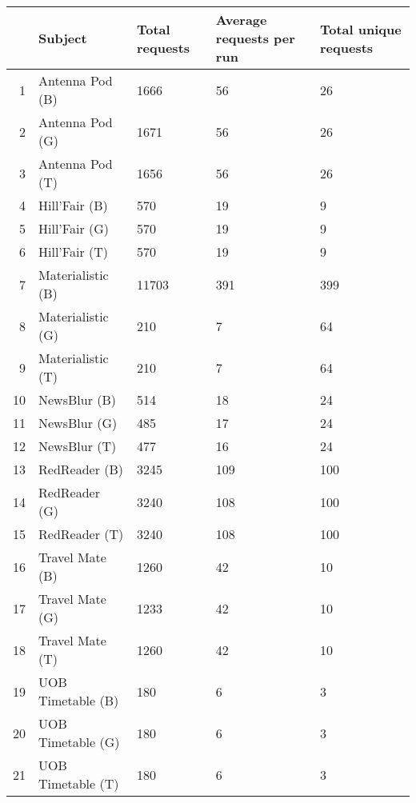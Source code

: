 \begin{table}[ht]
\centering
\begin{tabular}{rllll}
  \hline
 & Subject & Total requests & Average requests per run & Total unique requests \\ 
  \hline
1 & Antenna Pod (B) & 1666 & 56 & 26 \\ 
  2 & Antenna Pod (G) & 1671 & 56 & 26 \\ 
  3 & Antenna Pod (T) & 1656 & 56 & 26 \\ 
  4 & Hill'Fair (B) & 570 & 19 & 9 \\ 
  5 & Hill'Fair (G) & 570 & 19 & 9 \\ 
  6 & Hill'Fair (T) & 570 & 19 & 9 \\ 
  7 & Materialistic (B) & 11703 & 391 & 399 \\ 
  8 & Materialistic (G) & 210 & 7 & 64 \\ 
  9 & Materialistic (T) & 210 & 7 & 64 \\ 
  10 & NewsBlur (B) & 514 & 18 & 24 \\ 
  11 & NewsBlur (G) & 485 & 17 & 24 \\ 
  12 & NewsBlur (T) & 477 & 16 & 24 \\ 
  13 & RedReader (B) & 3245 & 109 & 100 \\ 
  14 & RedReader (G) & 3240 & 108 & 100 \\ 
  15 & RedReader (T) & 3240 & 108 & 100 \\ 
  16 & Travel Mate (B) & 1260 & 42 & 10 \\ 
  17 & Travel Mate (G) & 1233 & 42 & 10 \\ 
  18 & Travel Mate (T) & 1260 & 42 & 10 \\ 
  19 & UOB Timetable (B) & 180 & 6 & 3 \\ 
  20 & UOB Timetable (G) & 180 & 6 & 3 \\ 
  21 & UOB Timetable (T) & 180 & 6 & 3 \\ 
   \hline
\end{tabular}
\end{table}

